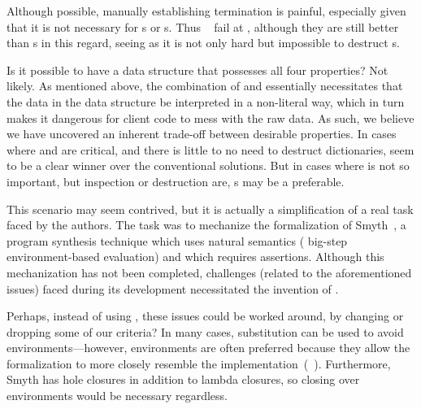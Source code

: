 Although possible, manually establishing termination is painful, especially given that it is not necessary
for {\sal}s or {\cal}s. Thus \dds~ fail at \EzDstr, although they are still better than {\fpf}s in this
regard, seeing as it is not only hard but impossible to destruct {\fpf}s.

Is it possible to have a data structure that possesses all four properties?
Not likely. As mentioned above, the combination of \SemInj{} and \SemTot{} essentially
necessitates that the data in the data structure be interpreted in a non-literal way, which in turn
makes it dangerous for client code to mess with the raw data. As such, we believe we have uncovered an
inherent trade-off between desirable properties. In cases where \SemTot{} and \EqDec{} are critical,
and there is little to no need to destruct dictionaries, \dds{} seem to be a clear winner over
the conventional solutions. But in cases where \SemTot{} is not so important,
but inspection or destruction are, {\cal}s may be a preferable.

This scenario may seem contrived, but it is actually a simplification of a real task faced by the authors.
The task was to mechanize the formalization of Smyth~\citep{smyth}, a program synthesis technique which uses
natural semantics (\ie{} big-step environment-based evaluation) and which requires assertions.
Although this mechanization has not been completed, challenges (related to the aforementioned issues)
faced during its development necessitated the invention of \dds.

Perhaps, instead of using \dds, these issues could be worked around, by changing or dropping some of our criteria?
In many cases, substitution can be used to avoid environments---however, environments are often preferred because
they allow the formalization to more closely resemble the implementation~(\eg{}~\citep{Ancona:2014}). Furthermore,
Smyth has hole closures in addition to lambda closures, so closing over environments would be necessary regardless.

